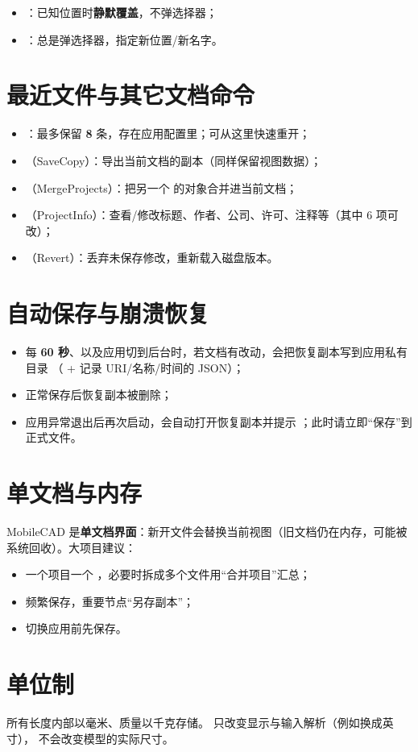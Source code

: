\begin{tip}[保存的两种方式]
\begin{itemize}
  \item {}：已知位置时\textbf{静默覆盖}，不弹选择器；
  \item {}：总是弹选择器，指定新位置/新名字。
\end{itemize}
\end{tip}

\section{最近文件与其它文档命令}

\begin{itemize}
  \item {}：最多保留 \textbf{8} 条，存在应用配置里；可从这里快速重开；
  \item {}（SaveCopy）：导出当前文档的副本（同样保留视图数据）；
  \item {}（MergeProjects）：把另一个  的对象合并进当前文档；
  \item {}（ProjectInfo）：查看/修改标题、作者、公司、许可、注释等（其中 6 项可改）；
  \item {}（Revert）：丢弃未保存修改，重新载入磁盘版本。
\end{itemize}

\section{自动保存与崩溃恢复}

\begin{itemize}
  \item 每 \textbf{60 秒}、以及应用切到后台时，若文档有改动，会把恢复副本写到应用私有目录
        （ + 记录 URI/名称/时间的 JSON）；
  \item 正常保存后恢复副本被删除；
  \item 应用异常退出后再次启动，会自动打开恢复副本并提示
        ；此时请立即“保存”到正式文件。
\end{itemize}

\section{单文档与内存}

MobileCAD 是\textbf{单文档界面}：新开文件会替换当前视图（旧文档仍在内存，可能被系统回收）。大项目建议：
\begin{itemize}
  \item 一个项目一个 ，必要时拆成多个文件用“合并项目”汇总；
  \item 频繁保存，重要节点“另存副本”；
  \item 切换应用前先保存。
\end{itemize}

\section{单位制}

所有长度内部以毫米、质量以千克存储。 只改变显示与输入解析（例如换成英寸），
不会改变模型的实际尺寸。
